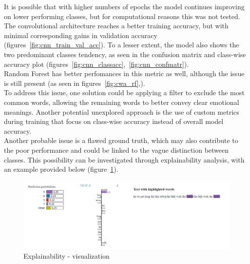 It is possible that with higher numbers of epochs the model continues improving
on lower performing classes, but for computational reasons this was not tested.\\

The convolutional architecture reaches a better training accuracy, but with minimal
corresponding gains in validation accuracy
(figures~\ref{fig:cnn_train_val_acc}).
To a lesser extent, the model also shows the two predominant classes tendency,
as seen in the confusion matrix and class-wise accuracy plot
(figures~\ref{fig:cnn_classacc},~\ref{fig:cnn_confmatr}).\\

Random Forest has better perfomances in this metric as well,
although the issue is still present (as seen in
figures~\ref{fig:cwa_rf},).\\

To address this issue, one solution could be applying a filter to exclude the most
common words, allowing the remaining words to better convey clear emotional
meanings. Another potential unexplored approach is the use of custom
metrics during training that focus on class-wise accuracy instead of overall model
accuracy.\\

Another probable issue is a flawed ground truth, which may
also contribute to the poor performance and could be linked to the vague distinction
between classes.
This possibility can be investigated through explainability analysis, with an
example provided below (figure~\ref{fig:expl}).

\begin{figure}[H]
    \centering
    \includegraphics[scale= 0.55]{pictures/expl.png}
    \caption{Explainability - visualization}
    \label{fig:expl}
\end{figure}

